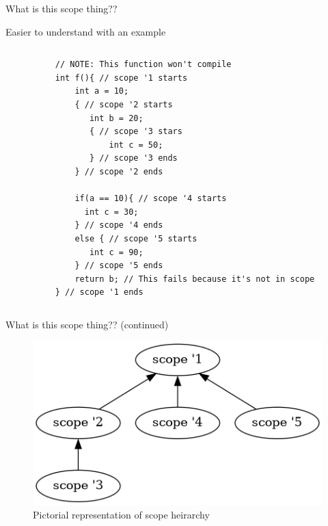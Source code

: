 \documentclass[
  10pt,
  ignorenonframetext,
]{beamer}
\begin{document}
\begin{frame}[fragile]{What is this scope thing??}
\protect\hypertarget{what-is-this-scope-thing}{}
\pause

\centering Easier to understand with an example

\pause

\begin{columns}[T]
\begin{column}{0.1\textwidth}
\end{column}

\begin{column}{0.9\textwidth}
\footnotesize

\begin{verbatim}
// NOTE: This function won't compile
int f(){ // scope '1 starts
    int a = 10;
    { // scope '2 starts
       int b = 20;
       { // scope '3 stars
           int c = 50;
       } // scope '3 ends
    } // scope '2 ends

    if(a == 10){ // scope '4 starts
      int c = 30;
    } // scope '4 ends
    else { // scope '5 starts
       int c = 90;
    } // scope '5 ends
    return b; // This fails because it's not in scope
} // scope '1 ends
\end{verbatim}

\normalsize
\end{column}
\end{columns}
\end{frame}

\begin{frame}{What is this scope thing??
(continued)}
\protect\hypertarget{what-is-this-scope-thing-continued}{}
\begin{figure}
\centering
\includegraphics{images/scope.png}
\caption{Pictorial representation of scope
heirarchy}
\end{figure}
\end{frame}
\end{document}
